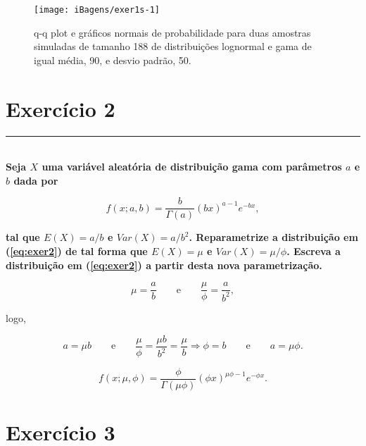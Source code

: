 \documentclass[12pt, oldfontcommands]{article}\usepackage[]{graphicx}\usepackage[]{color}
\makeatletter
\def\maxwidth{ %
  \ifdim\Gin@nat@width>\linewidth
    \linewidth
  \else
    \Gin@nat@width
  \fi
}
\newenvironment{knitrout}{}{} %
\newcommand{\horrule}[1]{\rule{\linewidth}{#1}}
\makeatother
\begin{document}
\begin{knitrout}\small
{}\color{fgcolor}\begin{figure}[H]

{\centering \texttt{[image: iBagens/exer1s-1]} 

}

\caption[q-q plot e gráficos normais de probabilidade para duas amostras simuladas de tamanho 188 de distribuições lognormal e gama de igual média, 90, e desvio padrão, 50]{q-q plot e gráficos normais de probabilidade para duas amostras simuladas de tamanho 188 de distribuições lognormal e gama de igual média, 90, e desvio padrão, 50.}\label{fig:exer1s}
\end{figure}


\end{knitrout}

\section*{Exercício 2} 

\horrule{1pt} \\

\textbf{Seja \(X\) uma variável aleatória de distribuição gama com 
        parâmetros \(a\) e \(b\) dada por}

\begin{equation}
 \label{eq:exer2}
 f(x; a, b) = \frac{b}{\Gamma(a)} (bx)^{a - 1} e^{-bx},
\end{equation}

\textbf{tal que \(E(X) = a/b\) e \(Var(X) = a/b^{2}\). Reparametrize a
        distribuição em (\ref{eq:exer2}) de tal forma que \(E(X) = \mu\) e
        \(Var(X) = \mu/\phi\). Escreva a distribuição em (\ref{eq:exer2})
        a partir desta nova parametrização.}

\[ \mu = \frac{a}{b}
   \qquad \text{e} \qquad
   \frac{\mu}{\phi} = \frac{a}{b^{2}}, \]

logo,

\[ a = \mu b
   \qquad \text{e} \qquad
   \frac{\mu}{\phi} = \frac{\mu b}{b^{2}} = \frac{\mu}{b}
   \Rightarrow \boxed{\phi = b}
   \qquad \text{e} \qquad \boxed{a = \mu \phi}. \]

\[ \boxed{f(x; \mu, \phi) = \frac{\phi}{\Gamma(\mu \phi)}
                            (\phi x)^{\mu \phi - 1} e^{-\phi x}}. \]

\section*{Exercício 3} 
\end{document}
